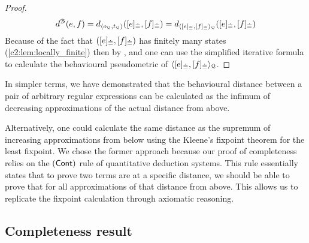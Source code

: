 \begin{proof}
    $$
    d^{\mathcal{B}}(e,f) = d_{\langle o_{\mathcal{Q}}, t_{\mathcal{Q}} \rangle}([e]_{\mathrel{\dot\equiv}},[f]_{\mathrel{\dot\equiv}}) = d_{\langle [e]_{{\mathrel{\dot\equiv}}},[f]_{{\mathrel{\dot\equiv}}} \rangle_{\mathcal{Q}}}([e]_{{\mathrel{\dot\equiv}}}, [f]_{{\mathrel{\dot\equiv}}})
    $$
    Because of the fact that $([e]_{{\mathrel{\dot\equiv}}}, [f]_{{\mathrel{\dot\equiv}}})$ has finitely many states (\cref{c2:lem:locally_finite}) then by ,  and  one can use the simplified iterative formula to calculate the behavioural pseudometric of $\langle [e]_{{\mathrel{\dot\equiv}}},[f]_{{\mathrel{\dot\equiv}}} \rangle_{\mathcal{Q}}$.
\end{proof}

In simpler terms, we have demonstrated that the behavioural distance between a pair of arbitrary regular expressions can be calculated as the infimum of decreasing approximations of the actual distance from above. 

Alternatively, one could calculate the same distance as the supremum of increasing approximations from below using the Kleene's fixpoint theorem for the least fixpoint. We chose the former approach because our proof of completeness relies on the $(\textsf{Cont})$ rule of quantitative deduction systems. This rule essentially states that to prove two terms are at a specific distance, we should be able to prove that for all approximations of that distance from above. This allows us to replicate the fixpoint calculation through axiomatic reasoning.
\subsection{Completeness result}\label{c2:subsec:completeness_result}

